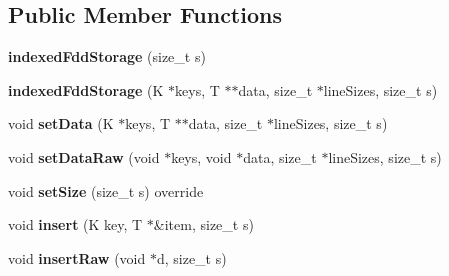\subsection*{Public Member Functions}
\begin{DoxyCompactItemize}
\item 
\hypertarget{classfaster_1_1indexedFddStorage_3_01K_00_01T_01_5_01_4_a0ad6ad05d9ccd4601ce2718827e295c1}{}\label{classfaster_1_1indexedFddStorage_3_01K_00_01T_01_5_01_4_a0ad6ad05d9ccd4601ce2718827e295c1} 
{\bfseries indexed\+Fdd\+Storage} (size\+\_\+t s)
\item 
\hypertarget{classfaster_1_1indexedFddStorage_3_01K_00_01T_01_5_01_4_a95c98e657a0443c3d384d897a4f8cb35}{}\label{classfaster_1_1indexedFddStorage_3_01K_00_01T_01_5_01_4_a95c98e657a0443c3d384d897a4f8cb35} 
{\bfseries indexed\+Fdd\+Storage} (K $\ast$keys, T $\ast$$\ast$data, size\+\_\+t $\ast$line\+Sizes, size\+\_\+t s)
\item 
\hypertarget{classfaster_1_1indexedFddStorage_3_01K_00_01T_01_5_01_4_a1f25a359fc75622309cb7f181d8545ef}{}\label{classfaster_1_1indexedFddStorage_3_01K_00_01T_01_5_01_4_a1f25a359fc75622309cb7f181d8545ef} 
void {\bfseries set\+Data} (K $\ast$keys, T $\ast$$\ast$data, size\+\_\+t $\ast$line\+Sizes, size\+\_\+t s)
\item 
\hypertarget{classfaster_1_1indexedFddStorage_3_01K_00_01T_01_5_01_4_a20ede574def362eae00630166dd6ca10}{}\label{classfaster_1_1indexedFddStorage_3_01K_00_01T_01_5_01_4_a20ede574def362eae00630166dd6ca10} 
void {\bfseries set\+Data\+Raw} (void $\ast$keys, void $\ast$data, size\+\_\+t $\ast$line\+Sizes, size\+\_\+t s)
\item 
\hypertarget{classfaster_1_1indexedFddStorage_3_01K_00_01T_01_5_01_4_ab26b5b1dc0eea07fb002f7144defcaa5}{}\label{classfaster_1_1indexedFddStorage_3_01K_00_01T_01_5_01_4_ab26b5b1dc0eea07fb002f7144defcaa5} 
void {\bfseries set\+Size} (size\+\_\+t s) override
\item 
\hypertarget{classfaster_1_1indexedFddStorage_3_01K_00_01T_01_5_01_4_a2bff285398ff9e7eb830b2a966643679}{}\label{classfaster_1_1indexedFddStorage_3_01K_00_01T_01_5_01_4_a2bff285398ff9e7eb830b2a966643679} 
void {\bfseries insert} (K key, T $\ast$\&item, size\+\_\+t s)
\item 
\hypertarget{classfaster_1_1indexedFddStorage_3_01K_00_01T_01_5_01_4_aeedf936a68804ea1f9e0b287ec786a74}{}\label{classfaster_1_1indexedFddStorage_3_01K_00_01T_01_5_01_4_aeedf936a68804ea1f9e0b287ec786a74} 
void {\bfseries insert\+Raw} (void $\ast$d, size\+\_\+t s)
\item 

\end{DoxyCompactItemize}
